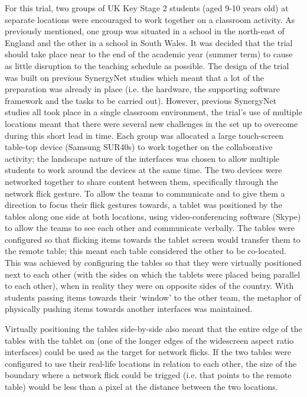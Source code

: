 \documentclass[a4paper,11pt]{article}
\begin{document}
For this trial, two groups of UK Key Stage 2 students (aged 9-10 years old) at separate locations were encouraged to work together on a classroom activity.
As previously mentioned, one group was situated in a school in the north-east of England and the other in a school in South Wales.
It was decided that the trial should take place near to the end of the academic year (summer term) to cause as little disruption to the teaching schedule as possible.
The design of the trial was built on previous SynergyNet studies which meant that a lot of the preparation was already in place (i.e. the hardware, the supporting software framework and the tasks to be carried out).
However, previous SynergyNet studies all took place in a single classroom environment, the trial's use of multiple locations meant that there were several new challenges in the set up to overcome during this short lead in time.
Each group was allocated a large touch-screen table-top device (Samsung SUR40s) to work together on the collaborative activity; the landscape nature of the interfaces was chosen to allow multiple students to work around the devices at the same time.
The two devices were networked together to share content between them, specifically through the network flick gesture.
To allow the teams to communicate and to give them a direction to focus their flick gestures towards, a tablet was positioned by the tables along one side at both locations, using video-conferencing software (Skype) to allow the teams to see each other and communicate verbally.
The tables were configured so that flicking items towards the tablet screen would transfer them to the remote table; this meant each table considered the other to be co-located.
This was achieved by configuring the tables so that they were virtually positioned next to each other (with the sides on which the tablets were placed being parallel to each other), when in reality they were on opposite sides of the country.
With students passing items towards their `window' to the other team, the metaphor of physically pushing items towards another interfaces was maintained.

Virtually positioning the tables side-by-side also meant that the entire edge of the tables with the tablet on (one of the longer edges of the widescreen aspect ratio interfaces) could be used as the target for network flicks.
If the two tables were configured to use their real-life locations in relation to each other, the size of the boundary where a network flick could be trigged (i.e. that points to the remote table) would be less than a pixel at the distance between the two locations.
\end{document}
